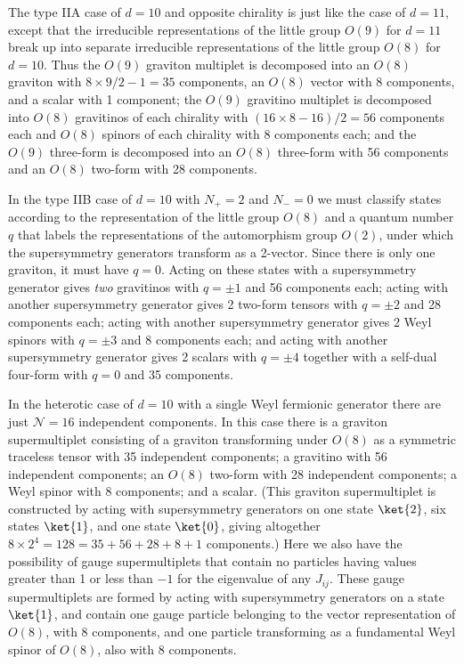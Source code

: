 The type IIA case of \(d=10\) and opposite chirality is just like the
case of \(d=11\), except that the irreducible representations of the
little group \(O(9)\) for \(d=11\) break up into separate irreducible
representations of the little group \(O(8)\) for \(d=10\). Thus the
\(O(9)\) graviton multiplet is decomposed into an \(O(8)\) graviton with
\(8\times9/2-1=35\) components, an \(O(8)\) vector with 8 components,
and a scalar with 1 component; the \(O(9)\) gravitino multiplet is
decomposed into \(O(8)\) gravitinos of each chirality with
\((16\times8-16)/2=56\) components each and \(O(8)\) spinors of each
chirality with 8 components each; and the \(O(9)\) three-form is
decomposed into an \(O(8)\) three-form with 56 components and an \(O(8)\)
two-form with 28 components.

In the type IIB case of \(d=10\) with \(N_+=2\) and \(N_-=0\) we must
classify states according to the representation of the little group
\(O(8)\) and a quantum number \(q\) that labels the representations of
the automorphism group \(O(2)\), under which the supersymmetry generators
transform as a 2-vector. Since there is only one graviton, it must have
\(q=0\). Acting on these states with a supersymmetry generator gives
\emph{two} gravitinos with \(q=\pm1\) and 56 components each; acting with
another supersymmetry generator gives 2 two-form tensors with \(q=\pm2\)
and 28 components each; acting with another supersymmetry generator gives
2 Weyl spinors with \(q=\pm3\) and 8 components each; and acting with
another supersymmetry generator gives 2 scalars with \(q=\pm4\) together
with a self-dual four-form with \(q=0\) and 35 components.

In the heterotic case of \(d=10\) with a single Weyl fermionic generator
there are just \(\mathcal N=16\) independent components. In this case
there is a graviton supermultiplet consisting of a graviton transforming
under \(O(8)\) as a symmetric traceless tensor with 35 independent
components; a gravitino with 56 independent components; an \(O(8)\)
two-form with 28 independent components; a Weyl spinor with 8 components;
and a scalar. (This graviton supermultiplet is constructed by acting with
supersymmetry generators on one state \(\ket{2}\), six states
\(\ket{1}\), and one state \(\ket{0}\), giving altogether
\(8\times2^4=128=35+56+28+8+1\) components.) Here we also have the
possibility of gauge supermultiplets that contain no particles having
values greater than 1 or less than \(-1\) for the eigenvalue of any
\(J_{ij}\). These gauge supermultiplets are formed by acting with
supersymmetry generators on a state \(\ket{1}\), and contain one
gauge particle belonging to the vector representation of \(O(8)\), with
8 components, and one particle transforming as a fundamental Weyl spinor
of \(O(8)\), also with 8 components.
